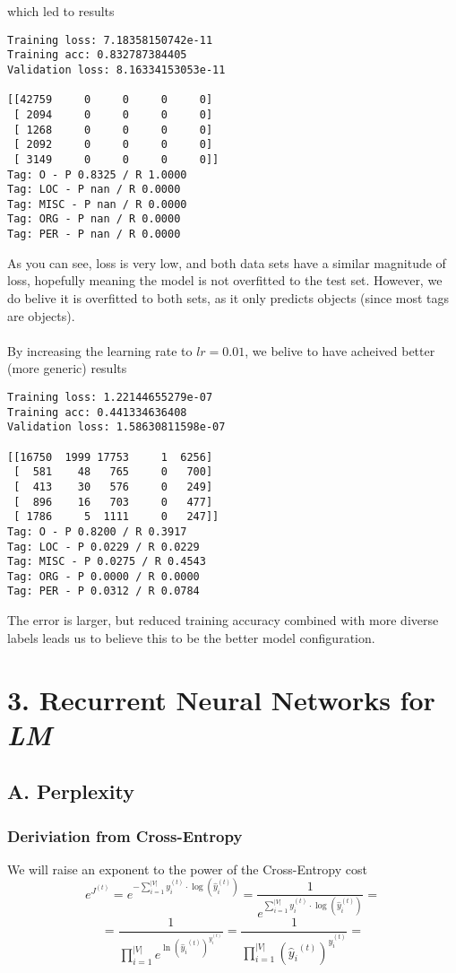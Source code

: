 \documentclass{article}
\begin{document}
which led to results

\begin{lstlisting}
Training loss: 7.18358150742e-11
Training acc: 0.832787384405
Validation loss: 8.16334153053e-11

[[42759     0     0     0     0]
 [ 2094     0     0     0     0]
 [ 1268     0     0     0     0]
 [ 2092     0     0     0     0]
 [ 3149     0     0     0     0]]
Tag: O - P 0.8325 / R 1.0000
Tag: LOC - P nan / R 0.0000
Tag: MISC - P nan / R 0.0000
Tag: ORG - P nan / R 0.0000
Tag: PER - P nan / R 0.0000
\end{lstlisting}

As you can see, loss is very low, and both data sets have a similar magnitude of loss, hopefully meaning the model is not overfitted to the test set. However, we do belive it is overfitted to both sets, as it only predicts objects (since most tags are objects). \\~\\
By increasing the learning rate to $lr=0.01$, we belive to have acheived better (more generic) results
\begin{lstlisting}
Training loss: 1.22144655279e-07
Training acc: 0.441334636408
Validation loss: 1.58630811598e-07

[[16750  1999 17753     1  6256]
 [  581    48   765     0   700]
 [  413    30   576     0   249]
 [  896    16   703     0   477]
 [ 1786     5  1111     0   247]]
Tag: O - P 0.8200 / R 0.3917
Tag: LOC - P 0.0229 / R 0.0229
Tag: MISC - P 0.0275 / R 0.4543
Tag: ORG - P 0.0000 / R 0.0000
Tag: PER - P 0.0312 / R 0.0784
\end{lstlisting}
 
The error is larger, but reduced training accuracy combined with more diverse labels leads us to believe this to be the better model configuration.

\section*{3. Recurrent Neural Networks for \emph{LM}}
\subsection*{A. Perplexity}
\subsubsection*{Deriviation from Cross-Entropy}
We will raise an exponent to the power of the Cross-Entropy cost
$$
	e^{J^{(t)}} = e^{-\sum_{i=1}^{|V|}{y_i^{(t)}}\cdot \log \left(\hat y_i^{(t)}\right)} = \frac {1} {e^{\sum_{i=1}^{|V|}{y_i^{(t)}}\cdot \log \left(\hat y_i^{(t)}\right)}} =
$$
$$
	= \frac {1} {\prod_{i=1}^{|V|}{e^{ \ln \left({\hat y_i}^{(t)} \right)^{y_i^{(t)}}}}} = \frac {1} {\prod_{i=1}^{|V|}{\left({\hat y_i}^{(t)} \right)^{y_i^{(t)}}}}= 
$$
\end{document}
